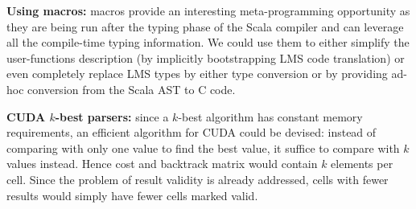 \item \textbf{Using macros:} macros provide an interesting meta-programming opportunity as they are being run after the typing phase of the Scala compiler and can leverage all the compile-time typing information. We could use them to either simplify the user-functions description (by implicitly bootstrapping LMS code translation) or even completely replace LMS types by either type conversion or by providing ad-hoc conversion from the Scala AST to C code.
\item \textbf{CUDA $k$-best parsers:} since a $k$-best algorithm has constant memory requirements, an efficient algorithm for CUDA could be devised: instead of comparing with only one value to find the best value, it suffice to compare with $k$ values instead. Hence cost and backtrack matrix would contain $k$ elements per cell. Since the problem of result validity is already addressed, cells with fewer results would simply have fewer cells marked valid.
\ole